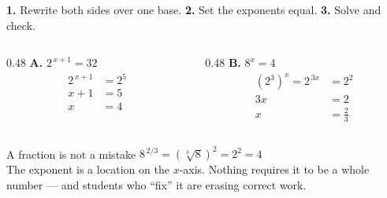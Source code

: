\documentclass[aspectratio=169, 11pt]{beamer}
\begin{document}
\begin{frame}[t, plain]
  \begin{center}
    {\footnotesize \textbf{1.} Rewrite both sides over one base. \quad \textbf{2.} Set the exponents
    equal. \quad \textbf{3.} Solve and check.}
  \end{center}
  \vspace{6pt}
  \begin{columns}[T]
    \begin{column}{0.48\textwidth}
      \footnotesize
      \textbf{A.} \; $2^{\,x+1}=32$
      \begin{align*}
        2^{\,x+1} &= 2^{5} \\
        x+1 &= 5 \\
        x &= 4
      \end{align*}
    \end{column}
    \begin{column}{0.48\textwidth}
      \footnotesize
      \textbf{B.} \; $8^{x}=4$
      \begin{align*}
        \left(2^{3}\right)^{x} = 2^{\,3x} &= 2^{2} \\
        3x &= 2 \\
        x &= \tfrac23
      \end{align*}
    \end{column}
  \end{columns}
  \vspace{4pt}
  \begin{center}
    \begin{minipage}{0.86\textwidth}
      \begin{block}{A fraction is not a mistake}
        $8^{\,2/3}=\left(\sqrt[3]{8}\right)^{2}=2^{2}=4$ \checkmark \\[3pt]
        {\scriptsize The exponent is a location on the $x$-axis. Nothing requires it to be a whole
        number --- and students who ``fix'' it are erasing correct work.}
      \end{block}
    \end{minipage}
  \end{center}
\end{frame}
\end{document}
